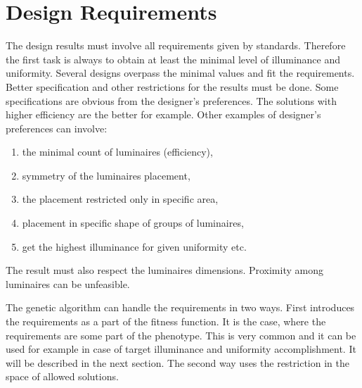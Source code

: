 \section{Design Requirements}
The design results must involve all requirements given by standards. Therefore the first task is always to obtain at least the minimal level of illuminance and uniformity. Several designs overpass the minimal values and fit the requirements. Better specification and other restrictions for the results must be done. Some specifications are obvious from the designer's preferences. The solutions with higher efficiency are the better for example. Other examples of designer's preferences can involve:

\begin{enumerate}
	\item the minimal count of luminaires (efficiency),
	\item symmetry of the luminaires placement,
	\item the placement restricted only in specific area,
	\item placement in specific shape of groups of luminaires,
	\item get the highest illuminance for given uniformity etc.
\end{enumerate}

The result must also respect the luminaires dimensions. Proximity among luminaires can be unfeasible.

The genetic algorithm can handle the requirements in two ways. First introduces the requirements as a part of the fitness function. It is the case, where the requirements are some part of the phenotype. This is very common and it can be used for example in case of target illuminance and uniformity accomplishment. It will be described in the next section. The second way uses the restriction in the space of allowed solutions.
